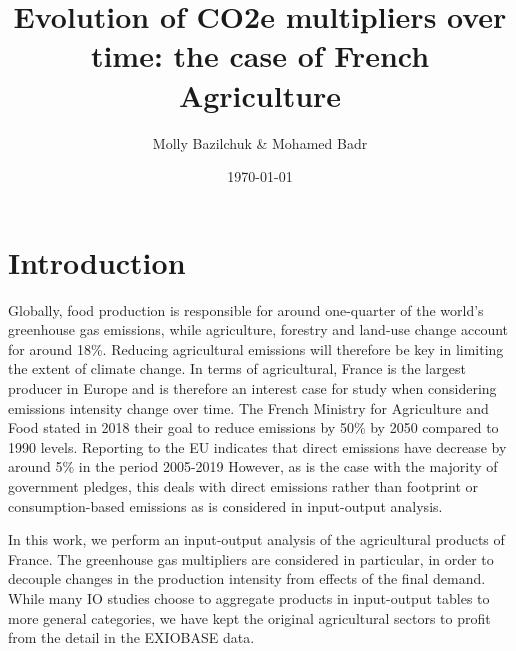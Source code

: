 \documentclass[a4paper,twoside]{article}
\title{Evolution of CO2e multipliers over time: the case of French Agriculture}
\author{Molly Bazilchuk & Mohamed Badr}
\date{\today}
\begin{document}
\maketitle
\vspace{3cm}


\section{Introduction}

Globally, food production is responsible for around one-quarter of the world's greenhouse gas emissions, while agriculture, forestry and land-use change account for around 18\%. Reducing agricultural emissions will therefore be key in limiting the extent of climate change. In terms of agricultural, France is the largest producer in Europe and is therefore an interest case for study when considering emissions intensity change over time. The French Ministry for Agriculture and Food stated in 2018 their goal to reduce emissions by 50\% by 2050 compared to 1990 levels. Reporting to the EU indicates that direct emissions have decrease by around 5\% in the period 2005-2019 \cite{euAgricultureEmissions} However, as is the case with the majority of government pledges, this deals with direct emissions rather than footprint or consumption-based emissions as is considered in input-output analysis. 

In this work, we perform an input-output analysis of the agricultural products of France. The greenhouse gas multipliers are considered in particular, in order to decouple changes in the production intensity from effects of the final demand. While many IO studies choose to aggregate products in input-output tables to more general categories, we have kept the original agricultural sectors to profit from the detail in the EXIOBASE data.
\end{document}
